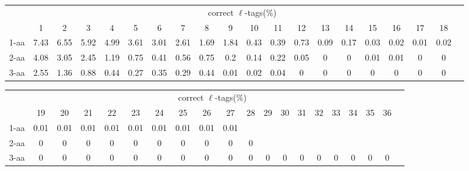 \documentclass{article}[12pt]
\begin{document}
\begin{landscape}

\begin{table}[h]\tiny
\vspace{3mm}
{\centering
\begin{center}
\begin{tabular}{|l|c|c|c|c|c|c|c|c|c|c|c|c|c|c|c|c|c|c|c|}
  \hline
  & \multicolumn{ 18 }{|c|}{correct $\ell$-tags(\%)} \\
  \cline{2- 19}
    & 1 & 2 & 3 & 4 & 5 & 6 & 7 & 8 & 9 & 10 & 11 & 12 & 13 & 14 & 15 & 16 & 17 & 18\\
  \hline
1-aa  & 7.43 & 6.55 & 5.92 & 4.99 & 3.61 & 3.01 & 2.61 & 1.69 & 1.84 & 0.43 & 0.39 & 0.73 & 0.09 & 0.17 & 0.03 & 0.02 & 0.01 & 0.02\\
2-aa  & 4.08 & 3.05 & 2.45 & 1.19 & 0.75 & 0.41 & 0.56 & 0.75 & 0.2 & 0.14 & 0.22 & 0.05 & 0 & 0 & 0.01 & 0.01 & 0 & 0\\
3-aa  & 2.55 & 1.36 & 0.88 & 0.44 & 0.27 & 0.35 & 0.29 & 0.44 & 0.01 & 0.02 & 0.04 & 0 & 0 & 0 & 0 & 0 & 0 & 0\\
 \hline
\end{tabular}
\end{center}
\par}
\centering

\vspace{3mm}
\end{table}
\begin{table}[h]\tiny
\vspace{3mm}
{\centering
\begin{center}
\begin{tabular}{|l|c|c|c|c|c|c|c|c|c|c|c|c|c|c|c|c|c|c|c|}
  \hline
  & \multicolumn{ 18 }{|c|}{correct $\ell$-tags(\%)} \\
  \cline{2- 19}
    & 19 & 20 & 21 & 22 & 23 & 24 & 25 & 26 & 27 & 28 & 29 & 30 & 31 & 32 & 33 & 34 & 35 & 36\\
  \hline
1-aa  & 0.01 & 0.01 & 0.01 & 0.01 & 0.01 & 0.01 & 0.01 & 0.01 & 0.01 &  &  &  &  &  &  &  &  & \\
2-aa  & 0 & 0 & 0 & 0 & 0 & 0 & 0 & 0 & 0 & 0 &  &  &  &  &  &  &  & \\
3-aa  & 0 & 0 & 0 & 0 & 0 & 0 & 0 & 0 & 0 & 0 & 0 & 0 & 0 & 0 & 0 & 0 & 0 & 0\\
 \hline
\end{tabular}
\end{center}
\par}
\centering


\end{table}
\end{landscape}
\end{document}
